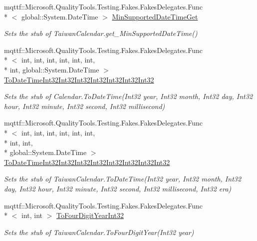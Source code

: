 \begin{DoxyCompactItemize}
mqttf\-::\-Microsoft.\-Quality\-Tools.\-Testing.\-Fakes.\-Fakes\-Delegates.\-Func\\*
$<$ global\-::\-System.\-Date\-Time $>$ \hyperlink{class_system_1_1_globalization_1_1_fakes_1_1_stub_taiwan_calendar_a6fe7abde4bf473b46bb8bdc5862689a9}{Min\-Supported\-Date\-Time\-Get}
\begin{DoxyCompactList}\small\item\em Sets the stub of Taiwan\-Calendar.\-get\-\_\-\-Min\-Supported\-Date\-Time()\end{DoxyCompactList}\item 
mqttf\-::\-Microsoft.\-Quality\-Tools.\-Testing.\-Fakes.\-Fakes\-Delegates.\-Func\\*
$<$ int, int, int, int, int, int, \\*
int, global\-::\-System.\-Date\-Time $>$ \hyperlink{class_system_1_1_globalization_1_1_fakes_1_1_stub_taiwan_calendar_aa8648cc6e8a012ea1791e580b9ae24c2}{To\-Date\-Time\-Int32\-Int32\-Int32\-Int32\-Int32\-Int32\-Int32}
\begin{DoxyCompactList}\small\item\em Sets the stub of Calendar.\-To\-Date\-Time(\-Int32 year, Int32 month, Int32 day, Int32 hour, Int32 minute, Int32 second, Int32 millisecond)\end{DoxyCompactList}\item 
mqttf\-::\-Microsoft.\-Quality\-Tools.\-Testing.\-Fakes.\-Fakes\-Delegates.\-Func\\*
$<$ int, int, int, int, int, int, \\*
int, int, \\*
global\-::\-System.\-Date\-Time $>$ \hyperlink{class_system_1_1_globalization_1_1_fakes_1_1_stub_taiwan_calendar_a80a4b46e70fa36db070f1133afe15156}{To\-Date\-Time\-Int32\-Int32\-Int32\-Int32\-Int32\-Int32\-Int32\-Int32}
\begin{DoxyCompactList}\small\item\em Sets the stub of Taiwan\-Calendar.\-To\-Date\-Time(\-Int32 year, Int32 month, Int32 day, Int32 hour, Int32 minute, Int32 second, Int32 millisecond, Int32 era)\end{DoxyCompactList}\item 
mqttf\-::\-Microsoft.\-Quality\-Tools.\-Testing.\-Fakes.\-Fakes\-Delegates.\-Func\\*
$<$ int, int $>$ \hyperlink{class_system_1_1_globalization_1_1_fakes_1_1_stub_taiwan_calendar_a323456f5ac1ce71c37afd874569bf481}{To\-Four\-Digit\-Year\-Int32}
\begin{DoxyCompactList}\small\item\em Sets the stub of Taiwan\-Calendar.\-To\-Four\-Digit\-Year(\-Int32 year)\end{DoxyCompactList}\item 

\end{DoxyCompactItemize}
